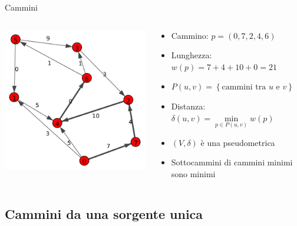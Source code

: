 \documentclass{beamer}
\theoremstyle{plain}
\theoremstyle{definition}
\theoremstyle{remark}
\newcommand{\set}[1]{\left\{#1\right\}}
\newcommand{\pa}[1]{\left(#1\right)}
\begin{document}
\begin{frame}{Cammini}
  \begin{columns}
    \begin{column}{0.40\textwidth}
      \includegraphics[width=\textwidth]{directpath}
    \end{column}
    \begin{column}{0.58\textwidth}
      \begin{itemize}
      \item Cammino: $p = \pa{ 0,7,2, 4,6}$
      \item Lunghezza: $w(p) = 7+4+10+0 = 21$
      \item $P(u,v) = \set{\text{cammini tra }u\text{ e }v}$
      \item Distanza: $\delta (u,v) = \min \limits _{p\in P(u,v)}
        w(p)$
      \item $\pa{V,\delta}$ \`e una pseudometrica
      \item Sottocammini di cammini minimi sono minimi
      \end{itemize}
    \end{column}
  \end{columns}
\end{frame}

\subsection{Cammini da una sorgente unica}
\end{document}
